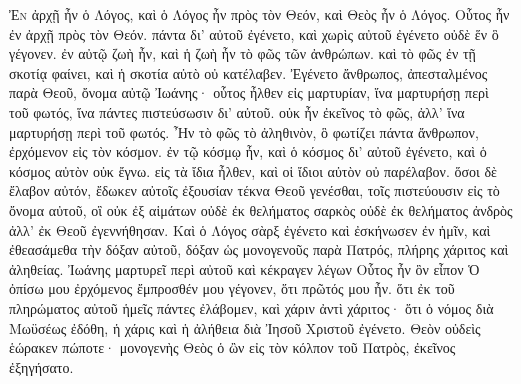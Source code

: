 \begin{pages}
    \begin{Rightside}
        \beginnumbering
		\renewcommand{\LettrineFontHook}{\PHtitl}
		\lettrine[lines=3]Ἐν ἀρχῇ ἦν ὁ Λόγος, καὶ ὁ Λόγος ἦν πρὸς τὸν Θεόν, καὶ Θεὸς ἦν ὁ Λόγος. Οὗτος ἦν ἐν ἀρχῇ πρὸς τὸν Θεόν. πάντα δι’ αὐτοῦ ἐγένετο, καὶ χωρὶς αὐτοῦ ἐγένετο οὐδὲ ἕν ὃ γέγονεν. ἐν αὐτῷ ζωὴ ἦν, καὶ ἡ ζωὴ ἦν τὸ φῶς τῶν ἀνθρώπων. καὶ τὸ φῶς ἐν τῇ σκοτίᾳ φαίνει, καὶ ἡ σκοτία αὐτὸ οὐ κατέλαβεν. Ἐγένετο ἄνθρωπος, ἀπεσταλμένος παρὰ Θεοῦ, ὄνομα αὐτῷ Ἰωάνης· οὗτος ἦλθεν εἰς μαρτυρίαν, ἵνα μαρτυρήσῃ περὶ τοῦ φωτός, ἵνα πάντες πιστεύσωσιν δι’ αὐτοῦ. οὐκ ἦν ἐκεῖνος τὸ φῶς, ἀλλ’ ἵνα μαρτυρήσῃ περὶ τοῦ φωτός. Ἦν τὸ φῶς τὸ ἀληθινὸν, ὃ φωτίζει πάντα ἄνθρωπον, ἐρχόμενον εἰς τὸν κόσμον. ἐν τῷ κόσμῳ ἦν, καὶ ὁ κόσμος δι’ αὐτοῦ ἐγένετο, καὶ ὁ κόσμος αὐτὸν οὐκ ἔγνω. εἰς τὰ ἴδια ἦλθεν, καὶ οἱ ἴδιοι αὐτὸν οὐ παρέλαβον. ὅσοι δὲ ἔλαβον αὐτόν, ἔδωκεν αὐτοῖς ἐξουσίαν τέκνα Θεοῦ γενέσθαι, τοῖς πιστεύουσιν εἰς τὸ ὄνομα αὐτοῦ, οἳ οὐκ ἐξ αἱμάτων οὐδὲ ἐκ θελήματος σαρκὸς οὐδὲ ἐκ θελήματος ἀνδρὸς ἀλλ’ ἐκ Θεοῦ ἐγεννήθησαν. Καὶ ὁ Λόγος σὰρξ ἐγένετο καὶ ἐσκήνωσεν ἐν ἡμῖν, καὶ ἐθεασάμεθα τὴν δόξαν αὐτοῦ, δόξαν ὡς μονογενοῦς παρὰ Πατρός, πλήρης χάριτος καὶ ἀληθείας. Ἰωάνης μαρτυρεῖ περὶ αὐτοῦ καὶ κέκραγεν λέγων Οὗτος ἦν ὃν εἶπον Ὁ ὀπίσω μου ἐρχόμενος ἔμπροσθέν μου γέγονεν, ὅτι πρῶτός μου ἦν. ὅτι ἐκ τοῦ πληρώματος αὐτοῦ ἡμεῖς πάντες ἐλάβομεν, καὶ χάριν ἀντὶ χάριτος· ὅτι ὁ νόμος διὰ Μωϋσέως ἐδόθη, ἡ χάρις καὶ ἡ ἀλήθεια διὰ Ἰησοῦ Χριστοῦ ἐγένετο. Θεὸν οὐδεὶς ἑώρακεν πώποτε· μονογενὴς Θεὸς ὁ ὢν εἰς τὸν κόλπον τοῦ Πατρὸς, ἐκεῖνος ἐξηγήσατο.
		\pend
		\pstart

\end{Rightside}
\end{pages}
